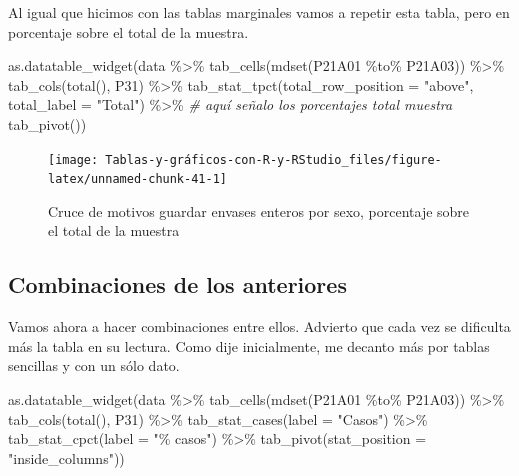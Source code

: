 \documentclass[
]{book}
\newenvironment{Shaded}{\begin{snugshade}}{\end{snugshade}}
\newcommand{\AttributeTok}[1]{\textcolor[rgb]{0.77,0.63,0.00}{#1}}
\newcommand{\CommentTok}[1]{\textcolor[rgb]{0.56,0.35,0.01}{\textit{#1}}}
\newcommand{\FunctionTok}[1]{\textcolor[rgb]{0.00,0.00,0.00}{#1}}
\newcommand{\NormalTok}[1]{#1}
\newcommand{\SpecialCharTok}[1]{\textcolor[rgb]{0.00,0.00,0.00}{#1}}
\newcommand{\StringTok}[1]{\textcolor[rgb]{0.31,0.60,0.02}{#1}}
\begin{document}
Al igual que hicimos con las tablas marginales vamos a repetir esta tabla, pero en porcentaje sobre el total de la muestra.

\begin{Shaded}
\begin{Highlighting}[]
\FunctionTok{as.datatable\_widget}\NormalTok{(data }\SpecialCharTok{\%\textgreater{}\%}
    \FunctionTok{tab\_cells}\NormalTok{(}\FunctionTok{mdset}\NormalTok{(P21A01 }\SpecialCharTok{\%to\%}\NormalTok{ P21A03)) }\SpecialCharTok{\%\textgreater{}\%}
    \FunctionTok{tab\_cols}\NormalTok{(}\FunctionTok{total}\NormalTok{(), P31) }\SpecialCharTok{\%\textgreater{}\%}
    \FunctionTok{tab\_stat\_tpct}\NormalTok{(}\AttributeTok{total\_row\_position =} \StringTok{"above"}\NormalTok{, }\AttributeTok{total\_label =} \StringTok{"Total"}\NormalTok{) }\SpecialCharTok{\%\textgreater{}\%} \CommentTok{\# aquí señalo los porcentajes total muestra}
    \FunctionTok{tab\_pivot}\NormalTok{())}
\end{Highlighting}
\end{Shaded}

\begin{figure}[H]

{\centering \texttt{[image: Tablas-y-gráficos-con-R-y-RStudio\_files/figure-latex/unnamed-chunk-41-1]} 

}

\caption{Cruce de motivos guardar envases enteros por sexo, porcentaje sobre el total de la muestra}\label{fig:unnamed-chunk-41}
\end{figure}

\hypertarget{combinaciones-de-los-anteriores-1}{%
\subsection{Combinaciones de los anteriores}\label{combinaciones-de-los-anteriores-1}}

Vamos ahora a hacer combinaciones entre ellos. Advierto que cada vez se dificulta más la tabla en su lectura. Como dije inicialmente, me decanto más por tablas sencillas y con un sólo dato.

\begin{Shaded}
\begin{Highlighting}[]
\FunctionTok{as.datatable\_widget}\NormalTok{(data }\SpecialCharTok{\%\textgreater{}\%} \FunctionTok{tab\_cells}\NormalTok{(}\FunctionTok{mdset}\NormalTok{(P21A01 }\SpecialCharTok{\%to\%} 
\NormalTok{  P21A03)) }\SpecialCharTok{\%\textgreater{}\%} \FunctionTok{tab\_cols}\NormalTok{(}\FunctionTok{total}\NormalTok{(), P31) }\SpecialCharTok{\%\textgreater{}\%} \FunctionTok{tab\_stat\_cases}\NormalTok{(}\AttributeTok{label =} \StringTok{"Casos"}\NormalTok{) }\SpecialCharTok{\%\textgreater{}\%} 
  \FunctionTok{tab\_stat\_cpct}\NormalTok{(}\AttributeTok{label =} \StringTok{"\% casos"}\NormalTok{) }\SpecialCharTok{\%\textgreater{}\%} \FunctionTok{tab\_pivot}\NormalTok{(}\AttributeTok{stat\_position =} \StringTok{"inside\_columns"}\NormalTok{))}
\end{Highlighting}
\end{Shaded}
\end{document}
